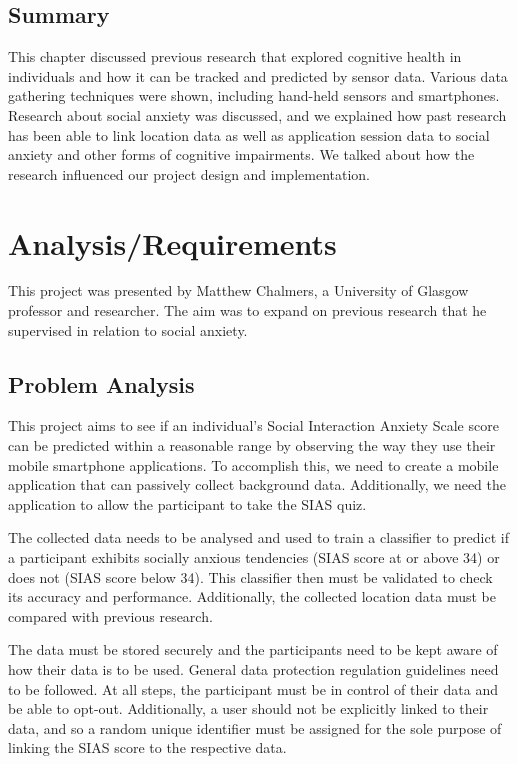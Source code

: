 \documentclass{l4proj}
\begin{document}
\section{Summary}
This chapter discussed previous research that explored cognitive health in individuals and how it can be tracked and predicted by sensor data. Various data gathering techniques were shown, including hand-held sensors and smartphones. Research about social anxiety was discussed, and we explained how past research has been able to link location data as well as application session data to social anxiety and other forms of cognitive impairments. We talked about how the research influenced our project design and implementation.
 
\chapter{Analysis/Requirements} \label{requirements}
This project was presented by Matthew Chalmers, a University of Glasgow professor and researcher. The aim was to expand on previous research that he supervised in relation to social anxiety. 

\section{Problem Analysis}
This project aims to see if an individual's Social Interaction Anxiety Scale score can be predicted within a reasonable range by observing the way they use their mobile smartphone applications. To accomplish this, we need to create a mobile application that can passively collect background data. Additionally, we need the application to allow the participant to take the SIAS quiz.

The collected data needs to be analysed and used to train a classifier to predict if a participant exhibits socially anxious tendencies (SIAS score at or above 34) or does not (SIAS score below 34). This classifier then must be validated to check its accuracy and performance. Additionally, the collected location data must be compared with previous research.

The data must be stored securely and the participants need to be kept aware of how their data is to be used. General data protection regulation guidelines \citep{gdpr_guidelines} need to be followed. At all steps, the participant must be in control of their data and be able to opt-out. Additionally, a user should not be explicitly linked to their data, and so a random unique identifier must be assigned for the sole purpose of linking the SIAS score to the respective data.
\end{document}
